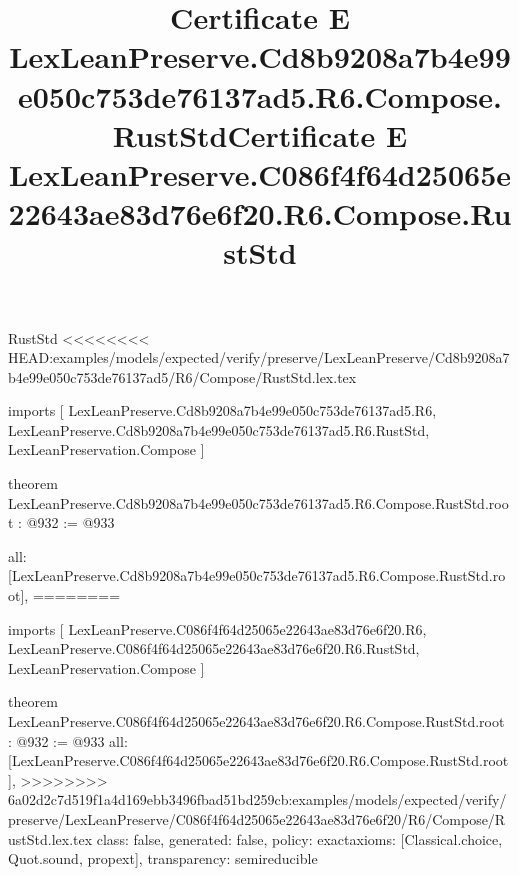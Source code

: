 \begin{lexlean}{RustStd}
<<<<<<<< HEAD:examples/models/expected/verify/preserve/LexLeanPreserve/Cd8b9208a7b4e99e050c753de76137ad5/R6/Compose/RustStd.lex.tex
\title{Certificate E LexLeanPreserve.Cd8b9208a7b4e99e050c753de76137ad5.R6.Compose.RustStd}
\begin{coremodule}
imports [
  LexLeanPreserve.Cd8b9208a7b4e99e050c753de76137ad5.R6,
  LexLeanPreserve.Cd8b9208a7b4e99e050c753de76137ad5.R6.RustStd,
  LexLeanPreservation.Compose
]

theorem LexLeanPreserve.Cd8b9208a7b4e99e050c753de76137ad5.R6.Compose.RustStd.root : @932 := @933 {
  all: [LexLeanPreserve.Cd8b9208a7b4e99e050c753de76137ad5.R6.Compose.RustStd.root],
========
\title{Certificate E LexLeanPreserve.C086f4f64d25065e22643ae83d76e6f20.R6.Compose.RustStd}
\begin{coremodule}
imports [
  LexLeanPreserve.C086f4f64d25065e22643ae83d76e6f20.R6,
  LexLeanPreserve.C086f4f64d25065e22643ae83d76e6f20.R6.RustStd,
  LexLeanPreservation.Compose
]

theorem LexLeanPreserve.C086f4f64d25065e22643ae83d76e6f20.R6.Compose.RustStd.root : @932 := @933 {
  all: [LexLeanPreserve.C086f4f64d25065e22643ae83d76e6f20.R6.Compose.RustStd.root],
>>>>>>>> 6a02d2c7d519f1a4d169ebb3496fbad51bd259cb:examples/models/expected/verify/preserve/LexLeanPreserve/C086f4f64d25065e22643ae83d76e6f20/R6/Compose/RustStd.lex.tex
  class: false,
  generated: false,
  policy: exact{axioms: [Classical.choice, Quot.sound, propext]},
  transparency: semireducible
}


\end{coremodule}}
\end{coremodule}
\end{lexlean}
